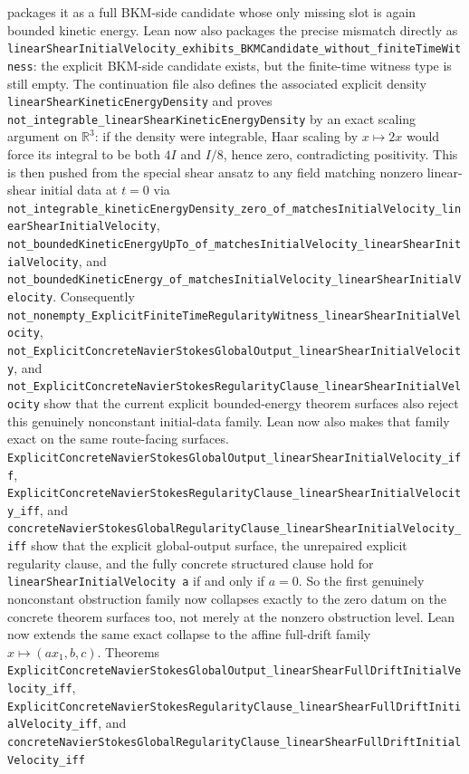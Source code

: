 \documentclass[11pt]{article}
\begin{document}
packages it as a full BKM-side candidate whose only missing slot is again
bounded kinetic energy.  Lean now also packages the precise mismatch directly as
\texttt{linearShearInitialVelocity\_exhibits\_BKMCandidate\_without\_finiteTimeWitness}:
the explicit BKM-side candidate exists, but the finite-time witness type is
still empty.  The continuation file also defines the associated explicit density
\texttt{linearShearKineticEnergyDensity} and proves
\texttt{not\_integrable\_linearShearKineticEnergyDensity} by an exact scaling
argument on \(\mathbb{R}^3\): if the density were integrable, Haar scaling by
\(x \mapsto 2x\) would force its integral to be both \(4I\) and \(I/8\), hence
zero, contradicting positivity.  This is then pushed from the special shear
ansatz to any field matching nonzero linear-shear initial data at \(t=0\) via
\texttt{not\_integrable\_kineticEnergyDensity\_zero\_of\_matchesInitialVelocity\_linearShearInitialVelocity},
\texttt{not\_boundedKineticEnergyUpTo\_of\_matchesInitialVelocity\_linearShearInitialVelocity},
and
\texttt{not\_boundedKineticEnergy\_of\_matchesInitialVelocity\_linearShearInitialVelocity}.
Consequently
\texttt{not\_nonempty\_ExplicitFiniteTimeRegularityWitness\_linearShearInitialVelocity},
\texttt{not\_ExplicitConcreteNavierStokesGlobalOutput\_linearShearInitialVelocity},
and
\texttt{not\_ExplicitConcreteNavierStokesRegularityClause\_linearShearInitialVelocity}
show that the current explicit bounded-energy theorem surfaces also reject this
genuinely nonconstant initial-data family.
Lean now also makes that family exact on the same route-facing surfaces.
\texttt{ExplicitConcreteNavierStokesGlobalOutput\_linearShearInitialVelocity\_iff},
\texttt{ExplicitConcreteNavierStokesRegularityClause\_linearShearInitialVelocity\_iff},
and \texttt{concreteNavierStokesGlobalRegularityClause\_linearShearInitialVelocity\_iff}
show that the explicit global-output surface, the unrepaired explicit
regularity clause, and the fully concrete structured clause hold for
\texttt{linearShearInitialVelocity a} if and only if \(a=0\).  So the first
genuinely nonconstant obstruction family now collapses exactly to the zero
datum on the concrete theorem surfaces too, not merely at the nonzero
obstruction level.
Lean now extends the same exact collapse to the affine full-drift family
\(x \mapsto (a x_1, b, c)\).  Theorems
\texttt{ExplicitConcreteNavierStokesGlobalOutput\_linearShearFullDriftInitialVelocity\_iff},
\texttt{ExplicitConcreteNavierStokesRegularityClause\_linearShearFullDriftInitialVelocity\_iff},
and
\texttt{concreteNavierStokesGlobalRegularityClause\_linearShearFullDriftInitialVelocity\_iff}
\end{document}

